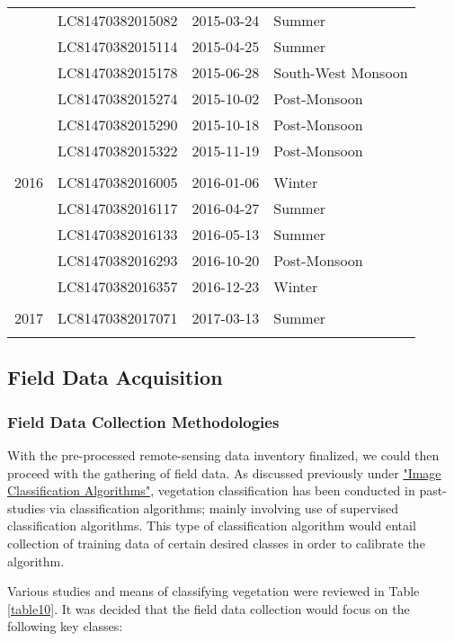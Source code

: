 \begin{ThreePartTable}
\begin{longtable}{L{2.3cm} L{4.5cm} L{3.4cm} L{4cm}}
		& LC81470382015082 & 2015-03-24 & Summer \\
		& LC81470382015114 & 2015-04-25 & Summer \\
		& LC81470382015178 & 2015-06-28 & South-West Monsoon \\
		& LC81470382015274 & 2015-10-02 & Post-Monsoon \\
		& LC81470382015290 & 2015-10-18 & Post-Monsoon \\
		& LC81470382015322 & 2015-11-19 & Post-Monsoon \\\\[-0.3cm]
		2016 & LC81470382016005 & 2016-01-06 & Winter \\\
		& LC81470382016117 & 2016-04-27 & Summer \\
		& LC81470382016133 & 2016-05-13 & Summer \\
		& LC81470382016293 & 2016-10-20 & Post-Monsoon \\
		& LC81470382016357 & 2016-12-23 & Winter \\\\[-0.3cm]
		2017 & LC81470382017071 & 2017-03-13 & Summer \\\\[-0.4cm]
		\bottomrule[0.25mm]
	\end{longtable}
\end{ThreePartTable}

\subsection{Field Data Acquisition}

\subsubsection{Field Data Collection Methodologies}

\justify
With the pre-processed remote-sensing data inventory finalized, we could then proceed with the gathering of field data. As discussed previously under \hyperref[litrev]{"Image Classification Algorithms"}, vegetation classification has been conducted in past-studies via classification algorithms; mainly involving use of supervised classification algorithms. This type of classification algorithm would entail collection of training data of certain desired classes in order to calibrate the algorithm.

\justify
Various studies and means of classifying vegetation were reviewed in Table \ref{table10}. It was decided that the field data collection would focus on the following key classes:

